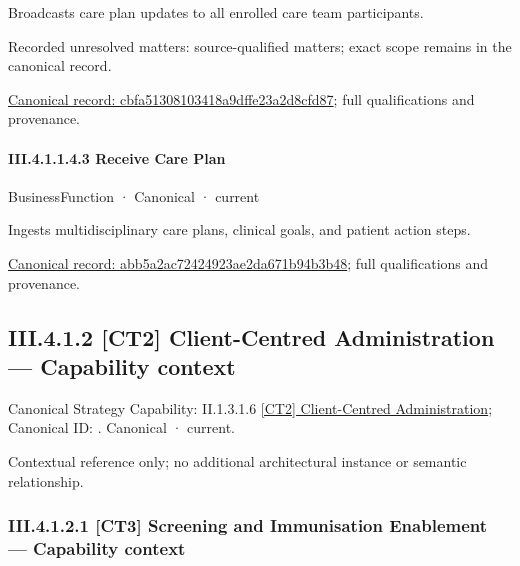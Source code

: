 Broadcasts care plan updates to all enrolled care team participants.


{\small Recorded unresolved matters: source-qualified matters; exact scope remains in the canonical record.}\par
{\footnotesize \href{../../../../../../../continuum/business/business-function/cbfa51308103418a9dffe23a2d8cfd87.md}{Canonical record: cbfa51308103418a9dffe23a2d8cfd87}; full qualifications and provenance.}\par
\paragraph*{III.4.1.1.4.3 Receive Care Plan}
\label{navigation:III.4.1.1.4.3}

\label{element:abb5a2ac72424923ae2da671b94b3b48}
{\small BusinessFunction · Canonical · current}\par

Ingests multidisciplinary care plans, clinical goals, and patient action steps.


{\footnotesize \href{../../../../../../../continuum/business/business-function/abb5a2ac72424923ae2da671b94b3b48.md}{Canonical record: abb5a2ac72424923ae2da671b94b3b48}; full qualifications and provenance.}\par
\subsection*{III.4.1.2 [CT2] Client-Centred Administration — Capability context}
\label{navigation:III.4.1.2}

{\small Canonical Strategy Capability: II.1.3.1.6 \hyperref[element:8752b7a937754b2faa296300c6a48911]{[CT2] Client-Centred Administration}; Canonical ID: \texttt{}. Canonical · current.}\par
Contextual reference only; no additional architectural instance or semantic relationship.\par
\subsubsection*{III.4.1.2.1 [CT3] Screening and Immunisation Enablement — Capability context}
\label{navigation:III.4.1.2.1}

